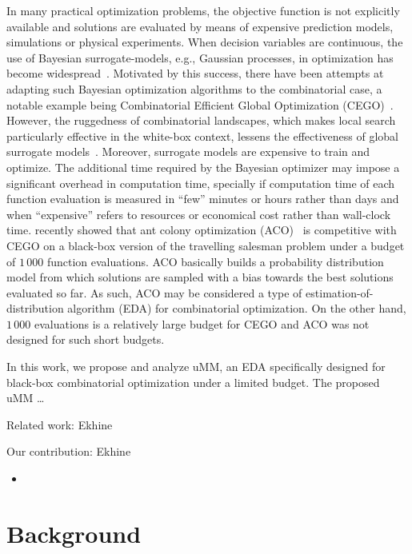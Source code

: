 \documentclass[runningheads]{llncs}
\begin{document}
In many practical optimization problems, the objective function is not
explicitly available and solutions are evaluated by means of expensive
prediction models, simulations or physical experiments. When decision variables
are continuous, the use of Bayesian surrogate-models, e.g., Gaussian processes,
in optimization has become
widespread~\citep{JonSchWel98go,ForKea2009surrogate}. Motivated by this
success, there have been attempts at adapting such Bayesian optimization
algorithms to the combinatorial case, a notable example being Combinatorial
Efficient Global Optimization
(CEGO)~\citep{ZaeStoBar2014:ppsn,ZaeStoFriFisNauBar2014}. However, the
ruggedness of combinatorial landscapes, which makes local search particularly
effective in the white-box context, lessens the effectiveness of global
surrogate models~\citep{EriPeaGar2019scalable}. Moreover, surrogate models are
expensive to train and optimize. The additional time required by the Bayesian
optimizer may impose a significant overhead in computation time, specially if
computation time of each function evaluation is measured in ``few'' minutes or
hours rather than days and when ``expensive'' refers to resources or economical
cost rather than wall-clock time. \citet{PerLopStu2015si} recently showed that
ant colony optimization (ACO)~\citep{DorStu2004:book} is competitive with CEGO
on a black-box version of the travelling salesman problem under a budget of
$1\,000$ function evaluations. ACO basically builds a probability distribution
model from which solutions are sampled with a bias towards the best solutions
evaluated so far. As such, ACO may be considered a type of
estimation-of-distribution algorithm (EDA) for combinatorial optimization. On
the other hand, $1\,000$ evaluations is a relatively large budget for CEGO and
ACO was not designed for such short budgets.

In this work, we propose and analyze uMM, an EDA specifically designed for
black-box combinatorial optimization under a limited budget. The proposed uMM \ldots{}
\


Related work: Ekhine

Our contribution: Ekhine
\begin{itemize}
\item 
\end{itemize}


\citep{LopDubPerStuBir2016irace}

\section{Background}\label{sec:backgroud}
\end{document}
